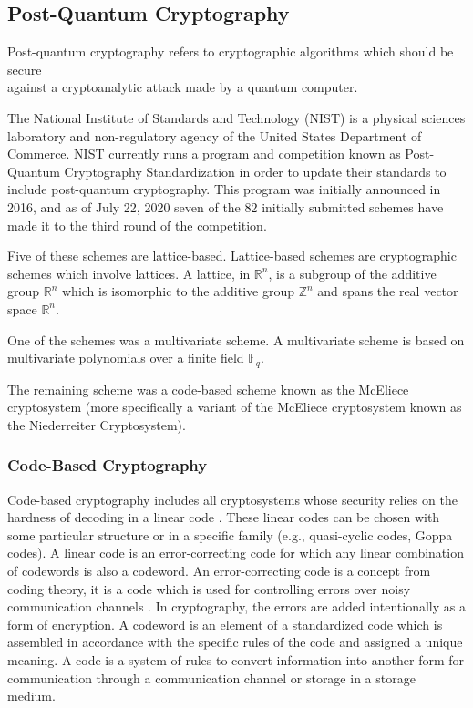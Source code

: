 \subsection{Post-Quantum Cryptography}

Post-quantum cryptography refers to cryptographic algorithms which should be secure\\ against a cryptoanalytic attack made by a quantum computer.

The National Institute of Standards and Technology (NIST) is a physical sciences laboratory and non-regulatory agency of the United States Department of Commerce. NIST currently runs a program and competition known as Post-Quantum Cryptography Standardization in order to update their standards to include post-quantum cryptography. This program was initially announced in 2016, and as of July 22, 2020 seven of the $82$ initially submitted schemes have made it to the third round of the competition.

Five of these schemes are lattice-based. Lattice-based schemes are cryptographic schemes which involve lattices. A lattice, in $\mathbb{R}^n$, is a subgroup of the additive group $\mathbb{R}^n$ which is isomorphic to the additive group $\mathbb{Z}^n$ and spans the real vector space $\mathbb{R}^n$.

One of the schemes was a multivariate scheme. A multivariate scheme is based on multivariate polynomials over a finite field $\mathbb{F}_q$.

The remaining scheme was a code-based scheme known as the McEliece cryptosystem (more specifically a variant of the McEliece cryptosystem known as the Niederreiter Cryptosystem).

\subsubsection{Code-Based Cryptography}

Code-based cryptography includes all cryptosystems whose security relies on the hardness of decoding in a linear code \cite{Sendrier2011}. These linear codes can be chosen with some particular structure or in a specific family (e.g., quasi-cyclic codes, Goppa codes). A linear code is an error-correcting code for which any linear combination of codewords is also a codeword. An error-correcting code is a concept from coding theory, it is a code which is used for controlling errors over noisy communication channels \cite{hamming1950}. In cryptography, the errors are added intentionally as a form of encryption. A codeword is an element of a standardized code which is assembled in accordance with the specific rules of the code and assigned a unique meaning. A code is a system of rules to convert information into another form for communication through a communication channel or storage in a storage medium.

